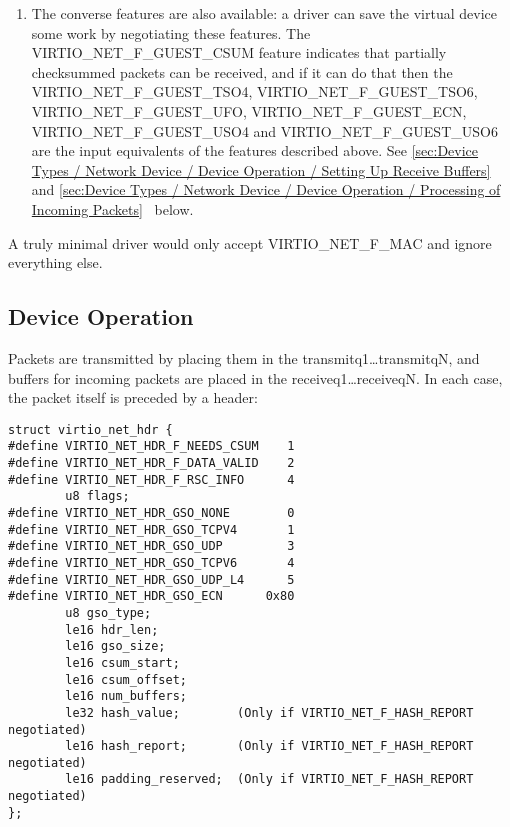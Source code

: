 \begin{enumerate}
\item The converse features are also available: a driver can save
  the virtual device some work by negotiating these features.
   The VIRTIO_NET_F_GUEST_CSUM feature indicates that partially
  checksummed packets can be received, and if it can do that then
  the VIRTIO_NET_F_GUEST_TSO4, VIRTIO_NET_F_GUEST_TSO6,
  VIRTIO_NET_F_GUEST_UFO, VIRTIO_NET_F_GUEST_ECN, VIRTIO_NET_F_GUEST_USO4
  and VIRTIO_NET_F_GUEST_USO6 are the input equivalents of the features described above.
  See \ref{sec:Device Types / Network Device / Device Operation /
Setting Up Receive Buffers}~ and
\ref{sec:Device Types / Network Device / Device Operation /
Processing of Incoming Packets}~ below.
\end{enumerate}

A truly minimal driver would only accept VIRTIO_NET_F_MAC and ignore
everything else.

\subsection{Device Operation}\label{sec:Device Types / Network Device / Device Operation}

Packets are transmitted by placing them in the
transmitq1\ldots transmitqN, and buffers for incoming packets are
placed in the receiveq1\ldots receiveqN. In each case, the packet
itself is preceded by a header:

\begin{lstlisting}
struct virtio_net_hdr {
#define VIRTIO_NET_HDR_F_NEEDS_CSUM    1
#define VIRTIO_NET_HDR_F_DATA_VALID    2
#define VIRTIO_NET_HDR_F_RSC_INFO      4
        u8 flags;
#define VIRTIO_NET_HDR_GSO_NONE        0
#define VIRTIO_NET_HDR_GSO_TCPV4       1
#define VIRTIO_NET_HDR_GSO_UDP         3
#define VIRTIO_NET_HDR_GSO_TCPV6       4
#define VIRTIO_NET_HDR_GSO_UDP_L4      5
#define VIRTIO_NET_HDR_GSO_ECN      0x80
        u8 gso_type;
        le16 hdr_len;
        le16 gso_size;
        le16 csum_start;
        le16 csum_offset;
        le16 num_buffers;
        le32 hash_value;        (Only if VIRTIO_NET_F_HASH_REPORT negotiated)
        le16 hash_report;       (Only if VIRTIO_NET_F_HASH_REPORT negotiated)
        le16 padding_reserved;  (Only if VIRTIO_NET_F_HASH_REPORT negotiated)
};
\end{lstlisting}

